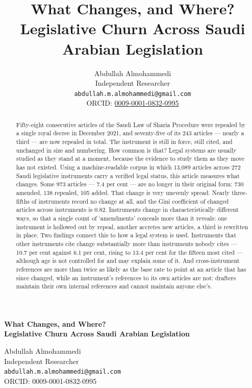 \documentclass[11pt]{article}
\title{What Changes, and Where?\\
Legislative Churn Across Saudi Arabian Legislation}
\author{Abdullah Almohammedi \\
    Independent Researcher \\
    \texttt{abdullah.m.almohammedi@gmail.com} \\
    ORCID: \href{https://orcid.org/0009-0001-0832-0995}{0009-0001-0832-0995}}
\date{}
\begin{document}
\begin{center}
{\Large\bfseries What Changes, and Where?\\[2pt]
Legislative Churn Across Saudi Arabian Legislation\par}
\end{center}
\begin{center}
Abdullah Almohammedi\\
Independent Researcher\\
\texttt{abdullah.m.almohammedi@gmail.com}\\
ORCID: 0009-0001-0832-0995
\end{center}
\vspace{1em}


\begin{abstract}
\noindent
Fifty-eight consecutive articles of the Saudi Law of Sharia Procedure were
repealed by a single royal decree in December 2021, and seventy-five of its
243 articles --- nearly a third --- are now repealed in total. The instrument
is still in force, still cited, and unchanged in size and numbering. How
common is that? Legal systems are usually studied as they stand at a moment,
because the evidence to study them as they move has not existed. Using a
machine-readable corpus in which 13,089 articles across 272 Saudi legislative
instruments carry a verified legal status, this article measures what
changes. Some 973 articles --- 7.4 per cent --- are no longer in their
original form: 730 amended, 138 repealed, 105 added. That change is very
unevenly spread. Nearly three-fifths of instruments record no change at all,
and the Gini coefficient of changed articles across instruments is 0.82.
Instruments change in characteristically different ways, so that a single
count of `amendments' conceals more than it reveals: one instrument is
hollowed out by repeal, another accretes new articles, a third is rewritten
in place. Two findings connect this to how a legal system is used. Instruments
that other instruments cite change substantially more than instruments nobody
cites --- 10.7 per cent against 6.1 per cent, rising to 13.4 per cent for the
fifteen most cited --- although age is not controlled for and may explain some
of it. And cross-instrument references are more than twice as likely as the
base rate to point at an article that has since changed, while an instrument's
references to its own articles are not: drafters maintain their own internal
references and cannot maintain anyone else's.
\end{abstract}
\end{document}
